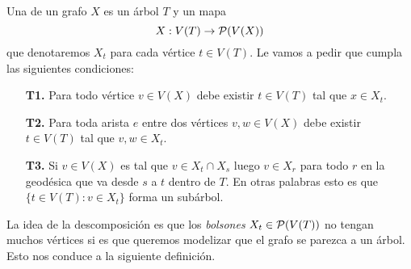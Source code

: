 \documentclass[tesis.tex]{subfiles}
\begin{document}
\begin{deff}\label{desc-arbol}
	 Una  de un grafo $X$ es un árbol $T$ y un mapa 
	 \[
	 X: V(T) \to {\cal P}(V(X))
	 \]
	  que denotaremos $X_t$ para cada vértice $t \in V(T)$. 
	  Le vamos a pedir que cumpla las siguientes condiciones:
	\begin{enumerate}
		\item[\textbf{T1.}] Para todo vértice $v \in V(X)$ debe existir $t \in V(T)$ tal que $x \in X_t$. 
		\item[\textbf{T2.}] Para toda arista $e$ entre dos vértices $v,w \in V(X)$ debe existir $t \in V(T)$ tal que $v,w \in X_t$.
		\item[\textbf{T3.}] Si $v \in V(X)$ es tal que $v \in X_t \cap X_s$ luego $v \in X_r$ para todo $r$ en la geodésica que va desde $s$ a $t$ dentro de $T$. En otras palabras esto es que $\{ t \in V(T) :  v \in X_t \}$ forma un subárbol. 
	\end{enumerate} 
\end{deff}
\smallskip

La idea de la descomposición es que los \emph{bolsones} $X_t \in {\cal P}(V(T))$ no tengan muchos vértices si es que queremos modelizar que el grafo se parezca a un árbol. Esto nos conduce a la siguiente definición.
\end{document}

